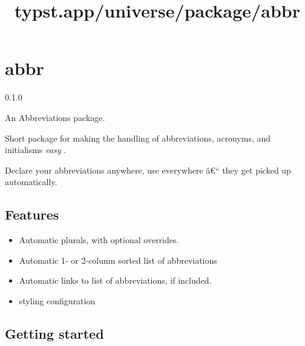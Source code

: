 \title{typst.app/universe/package/abbr}

\label{banner}
\section{abbr}\label{abbr}

{ 0.1.0 }

An Abbreviations package.

\label{readme}
Short package for making the handling of abbreviations, acronyms, and
initialisms \emph{easy} .

Declare your abbreviations anywhere, use everywhere â€`` they get picked
up automatically.

\subsection{Features}\label{features}

\begin{itemize}
\tightlist
\item
  Automatic plurals, with optional overrides.
\item
  Automatic 1- or 2-column sorted list of abbreviations
\item
  Automatic links to list of abbreviations, if included.
\item
  styling configuration
\end{itemize}

\subsection{Getting started}\label{getting-started}

\begin{Shaded}
\begin{Highlighting}[]

\NormalTok{)}



\end{Highlighting}
\end{Shaded}

